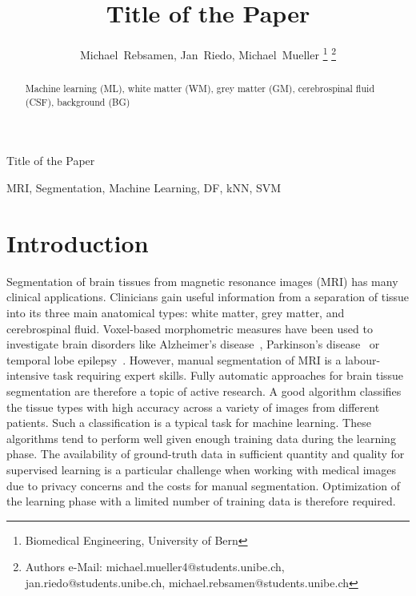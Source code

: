 \documentclass[journal]{IEEEtran}
\begin{document}
\title{Title of the Paper}


\author{Michael~Rebsamen,
        Jan~Riedo,
        Michael~Mueller%
\thanks{Biomedical Engineering, University of Bern}%
\thanks{Authors e-Mail: michael.mueller4@students.unibe.ch, jan.riedo@students.unibe.ch, michael.rebsamen@students.unibe.ch}}%
%
{Title of the Paper}
\maketitle

\begin{abstract}
Machine learning (ML), white matter (WM), grey matter (GM), cerebrospinal fluid (CSF), background (BG)
\end{abstract}
\begin{IEEEkeywords}
MRI, Segmentation, Machine Learning, DF, kNN, SVM
\end{IEEEkeywords}


\section{Introduction}
Segmentation of brain tissues from magnetic resonance images (MRI) has many clinical applications. Clinicians gain useful information from a separation of tissue into its three main anatomical types: white matter, grey matter, and cerebrospinal fluid. Voxel-based morphometric measures have been used to investigate brain disorders like Alzheimer’s disease~\cite{busatto2003voxel}, Parkinson's disease~\cite{price2004voxel} or temporal lobe epilepsy~\cite{rummel2017personalized}. However, manual segmentation of MRI is a labour-intensive task requiring expert skills. Fully automatic approaches for brain tissue segmentation are therefore a topic of active research. A good algorithm classifies the tissue types with high accuracy across a variety of images from different patients. Such a classification is a typical task for machine learning. These algorithms tend to perform well given enough training data during the learning phase. The availability of ground-truth data in sufficient quantity and quality for supervised learning is a particular challenge when working with medical images due to privacy concerns and the costs for manual segmentation. Optimization of the learning phase with a limited number of training data is therefore required.
\end{document}
